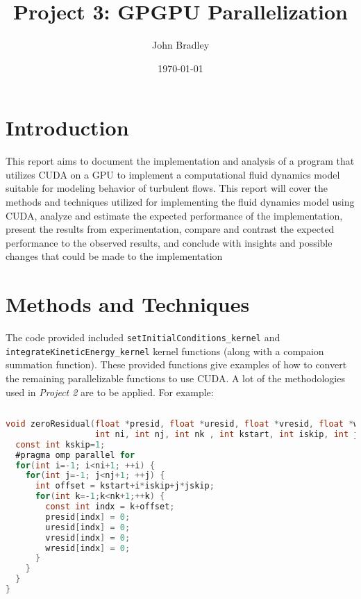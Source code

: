 \documentclass{article}
\title{Project 3: GPGPU Parallelization}
\author{John Bradley}
\date{\today}
\begin{document}
  \maketitle

  \section{Introduction}

  This report aims to document the implementation and analysis of a program
  that utilizes CUDA on a GPU to implement a computational fluid dynamics model
  suitable for modeling behavior of turbulent flows. This report will cover the
  methods and techniques utilized for implementing the fluid dynamics model
  using CUDA, analyze and estimate the expected performance of the 
  implementation, present the results from experimentation, compare and contrast 
  the expected performance to the observed results, and conclude with insights 
  and possible changes that could be made to the implementation
  
  \section{Methods and Techniques}

  The code provided included \verb|setInitialConditions_kernel| and
  \verb|integrateKineticEnergy_kernel| kernel functions (along with a compaion 
  summation function). These provided functions give examples of how to convert
  the remaining parallelizable functions to use CUDA. A lot of the 
  methodologies used in \textit{Project 2} are to be applied. For example: 

  \begin{lstfloat}
    \begin{lstlisting}[language=C, 
                      linewidth=1\textwidth,
                      breaklines=true, 
                      basicstyle=\small\ttfamily]
                     
void zeroResidual(float *presid, float *uresid, float *vresid, float *wresid,
                  int ni, int nj, int nk , int kstart, int iskip, int jskip) {
  const int kskip=1;
  #pragma omp parallel for
  for(int i=-1; i<ni+1; ++i) {
    for(int j=-1; j<nj+1; ++j) {
      int offset = kstart+i*iskip+j*jskip;
      for(int k=-1;k<nk+1;++k) {
        const int indx = k+offset;
        presid[indx] = 0;
        uresid[indx] = 0;
        vresid[indx] = 0;
        wresid[indx] = 0;
      }
    }
  }
}

    \end{lstlisting}
  \end{lstfloat}
\end{document}
